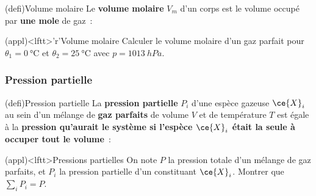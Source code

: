 \documentclass[../../main/main.tex]{subfiles}
\begin{document}
\begin{tcbraster}[raster columns=2, raster equal height=rows]
	\begin{tcb}[label=def:volmol](defi){Volume molaire}
		Le \textbf{volume molaire} $V_m$ d'un corps est le volume occupé par
		\textbf{une mole} de gaz~:
		\psw{%
			\[\boxed{V_m = \frac{V}{n}} \Leftrightarrow n = \frac{V}{V_m}\]
		}%
	\end{tcb}
	\begin{tcb}[label=exem:volmol](appl)<lftt>'r'{Volume molaire}
		Calculer le volume molaire d'un gaz parfait pour $\theta_1 =
			\SI{0}{\degreeCelsius}$ et $\theta_2 = \SI{25}{\degreeCelsius}$ avec $p
			= \SI{1013}{hPa}$.
		\tcblower

	\end{tcb}
\end{tcbraster}

\subsubsection{Pression partielle}
\begin{tcb*}[label=def:ppartielle](defi){Pression partielle}
	La \textbf{pression partielle} $P_i$ d'une espèce gazeuse $\ce{X}_i$ au
	sein d'un mélange de \textbf{gaz parfaits} de volume $V$ et de température $T$ est
	égale à la \textbf{pression qu'aurait le système si l'espèce $\ce{X}_i$
		était la seule à occuper tout le volume}~:
	\psw{%
		\[\boxed{P_iV = n_{g,i} RT}\]
	}%
	\vspace{-15pt}
\end{tcb*}

\begin{tcb}(appl)<lftt>{Pressions partielles}
	On note $P$ la pression totale d'un mélange de gaz parfaits, et $P_i$ la
	pression partielle d'un constituant $\ce{X}_i$. Montrer que $\sum_i P_i = P$.
	\tcblower
	\psw{%
		\[
			\sum_i P_i = \sum_i \frac{n_{g,i}RT}{V} = \frac{RT}{V} \sum_i n_{g,i} =
			\frac{n_{g,\tot}RT}{V} = P
			\qed
		\]
	}%
	\vspace{-15pt}
\end{tcb}
\end{document}
